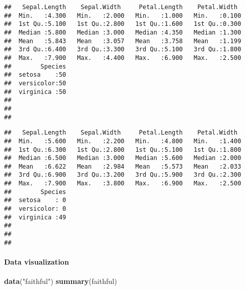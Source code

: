 \documentclass[]{article}
\newenvironment{Shaded}{\begin{snugshade}}{\end{snugshade}}
\newcommand{\KeywordTok}[1]{\textcolor[rgb]{0.13,0.29,0.53}{\textbf{#1}}}
\newcommand{\FloatTok}[1]{\textcolor[rgb]{0.00,0.00,0.81}{#1}}
\newcommand{\StringTok}[1]{\textcolor[rgb]{0.31,0.60,0.02}{#1}}
\newcommand{\OperatorTok}[1]{\textcolor[rgb]{0.81,0.36,0.00}{\textbf{#1}}}
\newcommand{\NormalTok}[1]{#1}
\let\oldparagraph\paragraph
\renewcommand{\paragraph}[1]{\oldparagraph{#1}\mbox{}}
\begin{document}
\begin{verbatim}
##   Sepal.Length    Sepal.Width     Petal.Length    Petal.Width   
##  Min.   :4.300   Min.   :2.000   Min.   :1.000   Min.   :0.100  
##  1st Qu.:5.100   1st Qu.:2.800   1st Qu.:1.600   1st Qu.:0.300  
##  Median :5.800   Median :3.000   Median :4.350   Median :1.300  
##  Mean   :5.843   Mean   :3.057   Mean   :3.758   Mean   :1.199  
##  3rd Qu.:6.400   3rd Qu.:3.300   3rd Qu.:5.100   3rd Qu.:1.800  
##  Max.   :7.900   Max.   :4.400   Max.   :6.900   Max.   :2.500  
##        Species  
##  setosa    :50  
##  versicolor:50  
##  virginica :50  
##                 
##                 
## 
\end{verbatim}

\begin{Shaded}
\end{Shaded}

\begin{verbatim}
##   Sepal.Length    Sepal.Width     Petal.Length    Petal.Width   
##  Min.   :5.600   Min.   :2.200   Min.   :4.800   Min.   :1.400  
##  1st Qu.:6.300   1st Qu.:2.800   1st Qu.:5.100   1st Qu.:1.800  
##  Median :6.500   Median :3.000   Median :5.600   Median :2.000  
##  Mean   :6.622   Mean   :2.984   Mean   :5.573   Mean   :2.033  
##  3rd Qu.:6.900   3rd Qu.:3.200   3rd Qu.:5.900   3rd Qu.:2.300  
##  Max.   :7.900   Max.   :3.800   Max.   :6.900   Max.   :2.500  
##        Species  
##  setosa    : 0  
##  versicolor: 0  
##  virginica :49  
##                 
##                 
## 
\end{verbatim}

\paragraph{Data visualization}\label{data-visualization}

\begin{Shaded}
\begin{Highlighting}[]
\KeywordTok{data}\NormalTok{(}\StringTok{"faithful"}\NormalTok{)}
\KeywordTok{summary}\NormalTok{(faithful)}
\end{Highlighting}
\end{Shaded}
\end{document}
